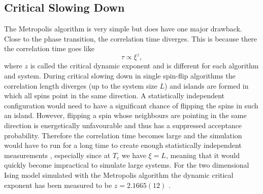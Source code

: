 \documentclass[11pt, a4paper]{report} %
\begin{document}
\subsection{Critical Slowing Down}\label{sec:critical_slowing_down}
The Metropolis algorithm is very simple but does have one major drawback.
Close to the phase transition, the correlation time diverges.
This is because there the correlation time goes like
\begin{equation}
	\tau \propto \xi^z,
\end{equation}
where \(z\) is called the critical dynamic exponent and is different for each algorithm and system.
During critical slowing down in single spin-flip algorithms the correlation length diverges (up to the system size \(L\)) and islands are formed in which all spins point in the same direction.
A statistically independent configuration would need to have a significant chance of flipping the spins in such an island.
However, flipping a spin whose neighbours are pointing in the same direction is energetically unfavourable and thus has a suppressed acceptance probability.
Therefore the correlation time becomes large and the simulation would have to run for a long time to create enough statistically independent measurements \cite{binney:1992}, especially since at \(T_c\) we have \(\xi = L\), meaning that it would quickly become impractical to simulate large systems.
For the two dimensional Ising model simulated with the  Metropolis algorithm the dynamic critical exponent has been measured to be \(z=2.1665(12)\) \cite{nightingale:1996}.
\end{document}
